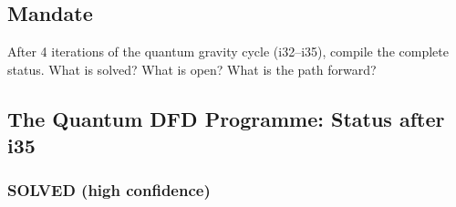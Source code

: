 \documentclass[11pt,a4paper]{article}
\begin{document}
\subsection{Mandate}

After 4 iterations of the quantum gravity cycle (i32--i35), compile the complete status. What is solved? What is open? What is the path forward?

\subsection{The Quantum DFD Programme: Status after i35}

\subsubsection{SOLVED (high confidence)}
\end{document}
